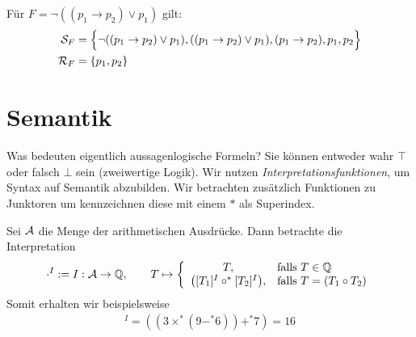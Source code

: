 \begin{beispiel}
	Für $F=\neg((p_1\to p_2)\vee p_1)$ gilt:
	\begin{align*}
		\mathcal{S}_F&=\Big\lbrace
			\neg((p_1\to p_2)\vee p_1),
			((p_1\to p_2)\vee p_1),
			(p_1\to p_2), p_1,
			p_2
		\Big\rbrace\\
		\mathcal{R}_F&=\lbrace p_1,p_2\rbrace
	\end{align*}
\end{beispiel}

\section{Semantik}
Was bedeuten eigentlich aussagenlogische Formeln? 
Sie können entweder wahr $\top$ oder falsch $\bot$ sein (zweiwertige Logik).
Wir nutzen \textit{Interpretationsfunktionen}, um Syntax auf Semantik abzubilden.
Wir betrachten zusätzlich Funktionen zu Junktoren um kennzeichnen diese mit einem $\ast$ als Superindex.

\begin{beispiel}
	Sei $\mathcal{A}$ die Menge der arithmetischen Ausdrücke.
	Dann betrachte die Interpretation
	\begin{align*}
		\cdot^I:=I:\mathcal{A}\to\mathbb{Q},\qquad T\mapsto\left\lbrace\begin{array}{cl}
			T ,&\text{falls } T\in\mathbb{Q}\\
			\big([T_1]^I\circ^\ast[T_2]^I\big), &\text{falls } T=(T_1\circ T_2)
		\end{array}\right.
	\end{align*}
	Somit erhalten wir beispielsweise
	\begin{align*}
		[((3\times(9-6))+7)]^I=((3\times^\ast(9-^\ast6))+^\ast7)=16
	\end{align*}
\end{beispiel}

